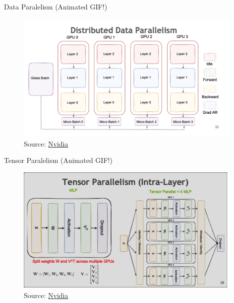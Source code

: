 
\begin{vbframe}{Data Paralelism (Animated GIF!)}

\vfill

\begin{figure}
	\centering
	\includegraphics[width = 11cm]{./figure/data_parallel.png} \\ 
	{\footnotesize Source: \href{https://docs.nvidia.com/nemo-framework/user-guide/latest/nemotoolkit/features/parallelisms.html#distributed-data-parallelism}{Nvidia}}
\end{figure}

\vfill

\end{vbframe}


\begin{vbframe}{Tensor Paralelism (Animated GIF!)}

\vfill

\begin{figure}
	\centering
	\includegraphics[width = 11cm]{./figure/tensor_paralel.png} \\ 
	{\footnotesize Source: \href{https://docs.nvidia.com/nemo-framework/user-guide/latest/nemotoolkit/features/parallelisms.html#tensor-parallelism}{Nvidia}}
\end{figure}

\vfill

\end{vbframe}

